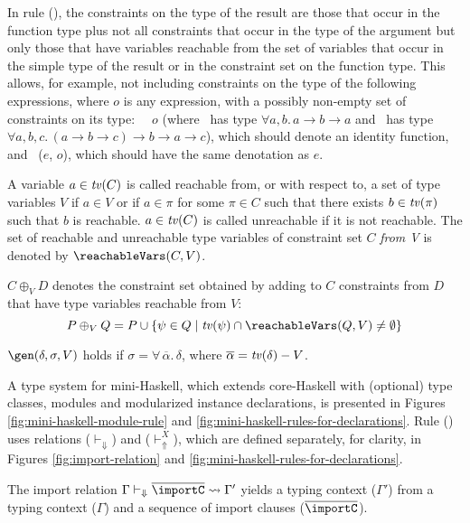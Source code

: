 In rule (\APP), the constraints on the type of the result are those
that occur in the function type plus not all constraints that occur in
the type of the argument but only those that have variables reachable
from the set of variables that occur in the simple type of the result
or in the constraint set on the function type.  This allows, for
example, not including constraints on the type of the following
expressions, where $o$ is any expression, with a possibly non-empty
set of constraints on its type: {\tt \flip\ \const\ $o$} (where
\const\ has type $\forall a, b.\,a \rightarrow b \rightarrow a$ and
\flip\ has type $\forall a, b, c.\,(a \rightarrow b \rightarrow c)
\rightarrow b \rightarrow a\rightarrow c$), which should denote an
identity function, and \fst\ ($e$, $o$), which should have the same
denotation as $e$.

A variable $a\in \text{\it tv\/}(C)$ is called reachable from, or with respect to,
a set of type variables $V$ if $a\in V$ or if $a\in \pi$ for some
$\pi\in C$ such that there exists $b\in \text{\it tv\/}(\pi)$ such that $b$ is
reachable. $a\in \text{\it tv\/}(C)$ is called unreachable if it is not
reachable. The set of reachable and unreachable type variables of
constraint set $C$ {\em from V\/} is denoted by $\reachableVars(C,V)$.


$C \oplus_V D$ denotes the constraint set obtained by adding to $C$
constraints from $D$ that have type variables reachable from $V$:
  \[ P \oplus_V Q = P \cup \{ \psi \in Q \mid \tv(\psi) \cap \reachableVars(Q,V) \not= \emptyset \} \]

$\gen(\delta,\sigma,V)$ holds if
  $\sigma=\forall\,\overline{\alpha}.\,\delta$, where
  $\overline{\alpha}=\text{\it tv\/}(\delta) - V$.

A type system for mini-Haskell, which extends core-Haskell with
(optional) type classes, modules and modularized instance
declarations, is presented in Figures
\ref{fig:mini-haskell-module-rule} and
\ref{fig:mini-haskell-rules-for-declarations}. Rule (\MODULE) uses
relations ($\vdash_{\Downarrow}$) and ($\vdash_{\Uparrow}^X$), which
are defined separately, for clarity, in Figures
\ref{fig:import-relation} and
\ref{fig:mini-haskell-rules-for-declarations}.

The import relation $\Gamma \vdash_{\Downarrow} \overline{\importC}
\leadsto \Gamma'$ yields a typing context ($\Gamma'$) from a typing
context ($\Gamma$) and a sequence of import clauses
($\overline{\importC}$).

